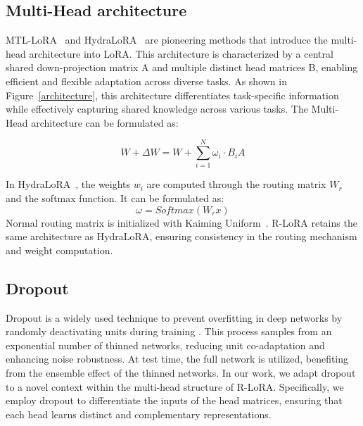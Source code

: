 \subsection{Multi-Head architecture}
\label{multi-head}
MTL-LoRA~\cite{yang2024mtlloralowrankadaptationmultitask} and HydraLoRA~\cite{tian2024hydraloraasymmetricloraarchitecture} are pioneering methods that introduce the multi-head architecture into LoRA. This architecture is characterized by a central shared down-projection matrix A and multiple distinct head matrices B, enabling efficient and flexible adaptation across diverse tasks. 
As shown in Figure~\ref{architecture}, this architecture differentiates task-specific information while effectively capturing shared knowledge across various tasks. The Multi-Head architecture can be formulated as:

\begin{equation}
    W + \Delta W = W + \sum_{i=1}^{N} \omega_i \cdot B_i A
    \label{eq:multi-head}
\end{equation}

In HydraLoRA~\cite{tian2024hydraloraasymmetricloraarchitecture}, the weights $w_i$ are computed through the routing matrix $W_r$ and the softmax function. It can be formulated as:
\begin{equation}
    \omega = Softmax(W_{r} x)
    \label{eq:multi-head}
\end{equation}
Normal routing matrix is initialized with Kaiming Uniform~\cite{he2015delving}. R-LoRA retains the same architecture as HydraLoRA, ensuring consistency in the routing mechanism and weight computation.

\subsection{Dropout}
Dropout is a widely used technique to prevent overfitting in deep networks by randomly deactivating units during training \cite{srivastava2014dropout}. This process samples from an exponential number of thinned networks, reducing unit co-adaptation and enhancing noise robustness. At test time, the full network is utilized, benefiting from the ensemble effect of the thinned networks. In our work, we adapt dropout to a novel context within the multi-head structure of R-LoRA. Specifically, we employ dropout to differentiate the inputs of the head matrices, ensuring that each head learns distinct and complementary representations.